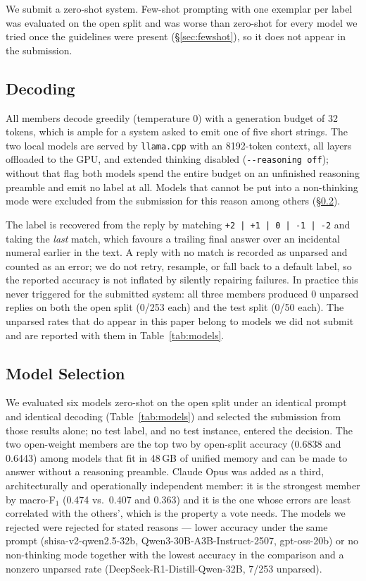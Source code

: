 We submit a zero-shot system. Few-shot prompting with one exemplar per
label was evaluated on the open split and was worse than zero-shot for
every model we tried once the guidelines were present
(\S\ref{sec:fewshot}), so it does not appear in the submission.

\subsection{Decoding}
\label{sec:decoding}

All members decode greedily (temperature $0$) with a generation budget
of 32 tokens, which is ample for a system asked to emit one of five
short strings. The two local models are served by \texttt{llama.cpp}
with an 8192-token context, all layers offloaded to the GPU, and
extended thinking disabled (\texttt{-{}-reasoning off}); without that
flag both models spend the entire budget on an unfinished reasoning
preamble and emit no label at all. Models that cannot be put into a
non-thinking mode were excluded from the submission for this reason
among others (\S\ref{sec:modelsel}).

The label is recovered from the reply by matching
\texttt{+2\,|\,+1\,|\,0\,|\,-1\,|\,-2} and taking the \emph{last}
match, which favours a trailing final answer over an incidental
numeral earlier in the text. A reply with no match is recorded as
unparsed and counted as an error; we do not retry, resample, or fall
back to a default label, so the reported accuracy is not inflated by
silently repairing failures. In practice this never triggered for the
submitted system: all three members produced 0 unparsed replies on both
the open split (0/253 each) and the test split (0/50 each). The
unparsed rates that do appear in this paper belong to models we did not
submit and are reported with them in Table~\ref{tab:models}.

\subsection{Model Selection}
\label{sec:modelsel}

We evaluated six models zero-shot on the open split under an identical
prompt and identical decoding (Table~\ref{tab:models}) and selected the
submission from those results alone; no test label, and no test
instance, entered the decision. The two open-weight members are the top
two by open-split accuracy (0.6838 and 0.6443) among models that fit in
48\,GB of unified memory and can be made to answer without a reasoning
preamble. Claude Opus was added as a third, architecturally and
operationally independent member: it is the strongest member by
macro-F$_1$ (0.474 vs.\ 0.407 and 0.363) and it is the one whose errors
are least correlated with the others', which is the property a vote
needs. The models we rejected were rejected for stated reasons ---
lower accuracy under the same prompt (shisa-v2-qwen2.5-32b,
Qwen3-30B-A3B-Instruct-2507, gpt-oss-20b) or no non-thinking mode
together with the lowest accuracy in the comparison and a nonzero
unparsed rate (DeepSeek-R1-Distill-Qwen-32B, 7/253 unparsed).

